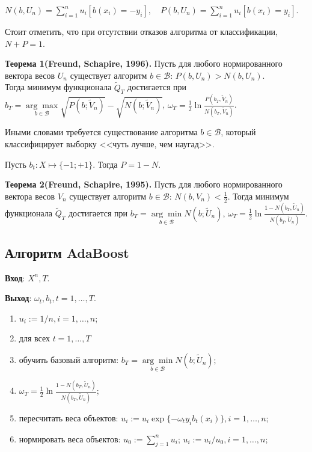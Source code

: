 \documentclass[specialist, 12pt, href]{article}
\begin{document}
$N(b, U_n) = \sum\limits_{i = 1}^n  u_i[b(x_i) = -y_i], \quad P(b, U_n) = \sum\limits_{i = 1}^n  u_i[b(x_i) = y_i].$

Стоит отметить, что при отсутствии отказов алгоритма от классификации, $N + P = 1$.

\textbf{Теорема 1(Freund, Schapire, 1996).} Пусть для любого нормированного вектора весов $ U_n$ существует алгоритм $b \in \mathcal{B}$: $P(b, U_n) > N(b, U_n)$. \\
Тогда минимум функционала $\tilde Q_T$ достигается при
$b_T =  \underset{b  \in \mathcal{B}}{\arg\max} \sqrt{P(b;\tilde V_n)} - \sqrt{N(b;\tilde V_n)}$, $\omega_T = \frac{1}{2} \ln\frac{P(b_T,\tilde V_n)}{N(b_T,\tilde V_n)}$.

Иными словами требуется существование алгоритма $b \in \mathcal{B}$, который классифицирует выборку <<чуть лучше, чем наугад>>.


Пусть $b_t: X \mapsto \{-1;+1\}$. Тогда $P = 1 - N$.

\textbf{Теорема 2(Freund, Schapire, 1995).} Пусть для любого нормированного вектора весов $ V_n$ существует алгоритм $b \in \mathcal{B}$: $N(b, V_n) < \frac{1}{2}$.
Тогда минимум функционала $\tilde Q_T$ достигается при 
$b_T =  \underset{b  \in \mathcal{B}}{\arg\min} N(b;\tilde U_n)$, $\omega_T = \frac{1}{2} \ln\frac{1 - N(b_T,\tilde U_n)}{N(b_T,\tilde U_n)}$.

\subsection*{Алгоритм AdaBoost}

{\bf {Вход}}: $X^n, T$.

{\bf {Выход}}: $\omega_t, b_t, t = 1,\dots,T$.
\begin{enumerate}
   \item $u_i := 1/n, i = 1,\dots,n$;
   \item для всех $t = 1,\dots,T$
   \item \quad обучить базовый алгоритм: $b_T =  \underset{b  \in \mathcal{B}}{\arg\min} N(b;\tilde U_n)$;
   \item \quad $\omega_T = \frac{1}{2} \ln\frac{1 - N(b_T,\tilde U_n)}{N(b_T,\tilde U_n)}$;
   \item \quad пересчитать веса объектов: $u_i := u_i \exp\{-\omega_t y_i b_t(x_i)\}, i = 1,\dots,n$;
   \item \quad нормировать веса объектов: $u_0 := \sum\limits_{j=1}^n u_i$; $u_i := u_i/u_0, i = 1,\dots,n$;
\end{enumerate}
\end{document}
